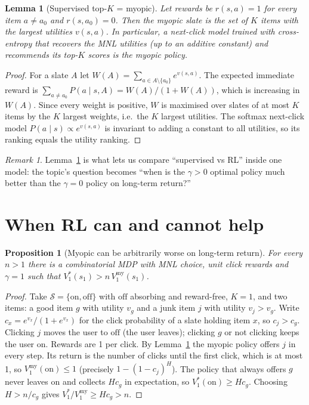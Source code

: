 \documentclass[11pt]{article}
\newtheorem{lemma}{Lemma}
\newtheorem{proposition}{Proposition}
\theoremstyle{remark}
\newtheorem{remark}{Remark}
\newcommand{\Sset}{\mathcal{S}}
\begin{document}
\begin{lemma}[Supervised top-$K$ = myopic]\label{lem:sup}
Let rewards be $r(s,a) = 1$ for every item $a \neq a_0$ and $r(s, a_0) = 0$. Then the myopic slate is the set of
$K$ items with the largest utilities $v(s,a)$. In particular, a next-click model trained with cross-entropy that
recovers the MNL utilities (up to an additive constant) and recommends its top-$K$ scores is the myopic policy.
\end{lemma}
\begin{proof}
For a slate $A$ let $W(A) = \sum_{a \in A \setminus\{a_0\}} e^{v(s,a)}$. The expected immediate reward is
$\sum_{a \neq a_0} P(a \mid s, A) = W(A) / (1 + W(A))$, which is increasing in $W(A)$. Since every weight is
positive, $W$ is maximised over slates of at most $K$ items by the $K$ largest weights, i.e.\ the $K$ largest
utilities. The softmax next-click model $P(a \mid s) \propto e^{v(s,a)}$ is invariant to adding a constant to all
utilities, so its ranking equals the utility ranking.
\end{proof}

\begin{remark}
Lemma~\ref{lem:sup} is what lets us compare ``supervised vs RL'' inside one model: the topic's question becomes
``when is the $\gamma > 0$ optimal policy much better than the $\gamma = 0$ policy on long-term return?''
\end{remark}

\section{When RL can and cannot help}

\begin{proposition}[Myopic can be arbitrarily worse on long-term return]\label{prop:dual}
For every $n > 1$ there is a combinatorial MDP with MNL choice, unit click rewards and $\gamma = 1$ such that
$V^*_1(s_1) > n\, V^{\mathrm{my}}_1(s_1)$.
\end{proposition}
\begin{proof}
Take $\Sset = \{\mathrm{on}, \mathrm{off}\}$ with $\mathrm{off}$ absorbing and reward-free, $K = 1$, and two items:
a good item $g$ with utility $v_g$ and a junk item $j$ with utility $v_j > v_g$. Write
$c_x = e^{v_x}/(1 + e^{v_x})$ for the click probability of a slate holding item $x$, so $c_j > c_g$.
Clicking $j$ moves the user to $\mathrm{off}$ (the user leaves); clicking $g$ or not clicking keeps the user $\mathrm{on}$.
Rewards are 1 per click. By Lemma~\ref{lem:sup} the myopic policy offers $j$ in every step. Its return is the
number of clicks until the first click, which is at most 1, so $V^{\mathrm{my}}_1(\mathrm{on}) \le 1$
(precisely $1 - (1 - c_j)^H$). The policy that always offers $g$ never leaves $\mathrm{on}$ and collects
$H c_g$ in expectation, so $V^*_1(\mathrm{on}) \ge H c_g$. Choosing $H > n / c_g$ gives
$V^*_1 / V^{\mathrm{my}}_1 \ge H c_g > n$.
\end{proof}
\end{document}
